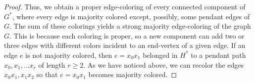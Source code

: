 \documentclass[10pt,a4paper]{amsart}
\begin{document}
\begin{proof}
Thus, we obtain a proper edge-coloring of every connected component of $G^*$, where every edge is majority colored except, possibly, some pendant edges of $G$. The sum of these colorings yields a strong majority edge-coloring of the graph $G$. This is because each coloring is proper, so a new component can add two or three edges with different colors incident to an end-vertex of a given edge. If an edge $e$ is not majority colored, then $e=x_0x_1$ belonged in $H^*$ to a pendant path $x_0,x_1,\ldots x_r$ of length $r\ge 2$. As we have noticed above, we can recolor the edges $x_0x_1, x_1x_2$ so that $e=x_0x_1$ becomes majority colored.
\end{proof}
\end{document}

